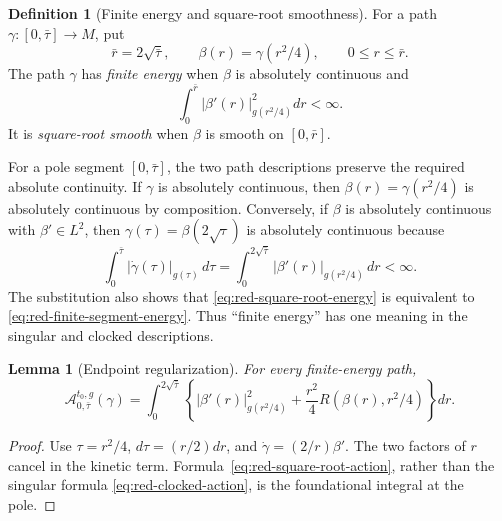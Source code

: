 \documentclass[10pt]{coll-l}
\newtheorem{lemma}[theorem]{Lemma}
\theoremstyle{definition}
\newtheorem{definition}[theorem]{Definition}
\theoremstyle{remark}
\numberwithin{section}{chapter}
\numberwithin{equation}{chapter}
\begin{document}
\begin{definition}[Finite energy and square-root smoothness]
\label{def:red-square-root-path}
For a path $\gamma:[0,\bar\tau]\to M$, put
\begin{equation}
       \bar r=2\sqrt{\bar\tau},
       \qquad \beta(r)=\gamma(r^2/4),
       \qquad 0\leq r\leq\bar r.                       \label{eq:red-square-root-path}
\end{equation}
The path $\gamma$ has \emph{finite energy} when $\beta$ is absolutely
continuous and
\begin{equation}
        \int_0^{\bar r}|\beta'(r)|_{g(r^2/4)}^2dr<\infty.
                                                               \label{eq:red-square-root-energy}
\end{equation}
It is \emph{square-root smooth} when $\beta$ is smooth on
$[0,\bar r]$.
\end{definition}

For a pole segment $[0,\bar\tau]$, the two path descriptions preserve the
required absolute continuity.  If $\gamma$ is absolutely continuous, then
$\beta(r)=\gamma(r^2/4)$ is absolutely continuous by composition.  Conversely,
if $\beta$ is absolutely continuous with $\beta'\in L^2$, then
$\gamma(\tau)=\beta(2\sqrt\tau)$ is absolutely continuous because
\begin{equation}
 \int_0^{\bar\tau}|\dot\gamma(\tau)|_{g(\tau)}\,d\tau
       =\int_0^{2\sqrt{\bar\tau}}
          |\beta'(r)|_{g(r^2/4)}\,dr<\infty.            \label{eq:red-AC-reparametrization}
\end{equation}
The substitution also shows that
\eqref{eq:red-square-root-energy} is equivalent to
\eqref{eq:red-finite-segment-energy}.  Thus ``finite energy'' has one
meaning in the singular and clocked descriptions.

\begin{lemma}[Endpoint regularization]
\label{lem:red-square-root-action}
For every finite-energy path,
\begin{equation}
 \mathcal A^{t_0,g}_{0,\bar\tau}(\gamma)
 =\int_0^{2\sqrt{\bar\tau}}
   \left\{|\beta'(r)|_{g(r^2/4)}^2
       +\frac{r^2}{4}R(\beta(r),r^2/4)\right\}dr.       \label{eq:red-square-root-action}
\end{equation}
\end{lemma}

\begin{proof}
Use $\tau=r^2/4$, $d\tau=(r/2)dr$, and
$\dot\gamma=(2/r)\beta'$.  The two factors of $r$ cancel in the kinetic
term.  Formula~\eqref{eq:red-square-root-action}, rather than the singular
formula \eqref{eq:red-clocked-action}, is the foundational integral at the
pole.
\end{proof}
\end{document}
